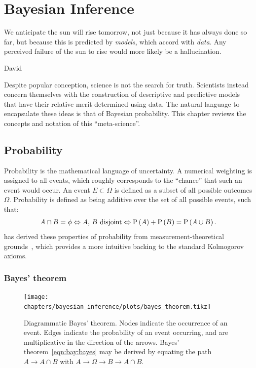 \chapter{Bayesian Inference}
\label{chp:bay}
\epigraph{We anticipate the sun will rise tomorrow, not just because it has always done so far, but because this is predicted by {\em models}, which accord with {\em data}. Any perceived failure of the sun to rise would more likely be a hallucination.}{David~\cite{MacKay}}
\noindent Despite popular conception, science is not the search for truth. Scientists instead concern themselves with the construction of descriptive and predictive models that have their relative merit determined using data.
The natural language to encapsulate these ideas is that of Bayesian probability. This chapter reviews the concepts and notation of this ``meta-science''.

\section{Probability}
\label{sec:bay:prob}

Probability is the mathematical language of uncertainty. 
A numerical weighting is assigned to all events, which roughly corresponds to the ``chance'' that such an event would occur. An event \(E\subset \Omega\) is defined as a subset of all possible outcomes \(\Omega\). Probability is defined as being additive over the set of all possible events, such that:
\begin{equation}
  A\cap B = \phi \Leftrightarrow \text{\(A\), \(B\) disjoint} \Leftrightarrow \mathrm{P}\left(A\right) + \mathrm{P}\left(B\right) = \mathrm{P}\left(A\cup B\right).
\end{equation}
\johnskilling{} has derived these properties of probability from measurement-theoretical grounds~\citep[chap. 1]{Bayesian_methods_in_cosmology}, which provides a more intuitive backing to the standard Kolmogorov axioms.

\subsection{Bayes' theorem}

\begin{figure}[tp]
  \centering
  \texttt{[image: chapters/bayesian\_inference/plots/bayes\_theorem.tikz]}
  \caption{Diagrammatic Bayes' theorem. Nodes indicate the occurrence of an event. Edges indicate the probability of an event occurring, and are multiplicative in the direction of the arrows. Bayes' theorem~\protect\eqref{eqn:bay:bayes} may be derived by equating the path \(A\to A\cap B\) with \(A\to\Omega\to B\to A\cap B\).}\label{fig:bay:bayes_theorem}
\end{figure}



